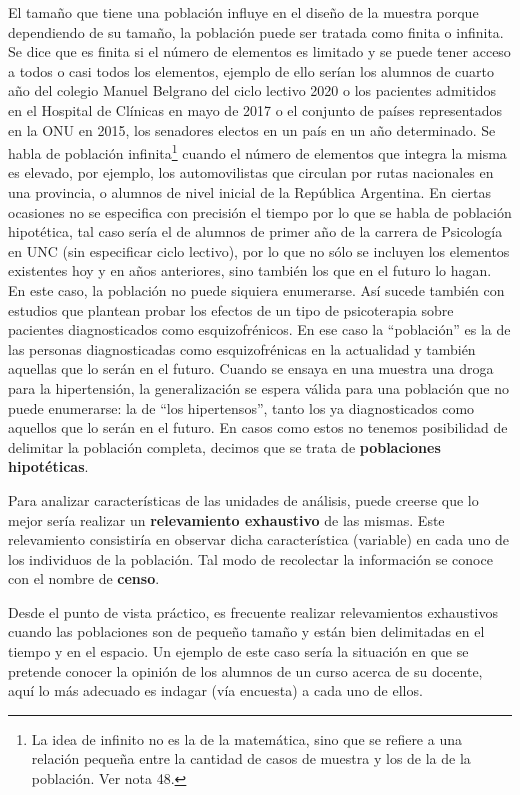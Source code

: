 \documentclass[]{book}
\let\rmarkdownfootnote\footnote%
\def\footnote{\protect\rmarkdownfootnote}
\begin{document}
El tamaño que tiene una población influye en el diseño de la muestra
porque dependiendo de su tamaño, la población puede ser tratada como
finita o infinita. Se dice que es finita si el número de elementos es
limitado y se puede tener acceso a todos o casi todos los elementos,
ejemplo de ello serían los alumnos de cuarto año del colegio Manuel
Belgrano del ciclo lectivo 2020 o los pacientes admitidos en el Hospital
de Clínicas en mayo de 2017 o el conjunto de países representados en la ONU en 2015, los senadores electos en un país en un año determinado. Se habla de población infinita\footnote{La idea de infinito no es la de la matemática, sino que se refiere a una relación pequeña entre la cantidad de casos de muestra y los de la de la población. Ver nota 48.} cuando
el número de elementos que integra la misma es elevado, por ejemplo, los automovilistas que circulan por rutas nacionales en una provincia, o alumnos de nivel inicial de la República Argentina. En ciertas ocasiones no se especifica con precisión el tiempo por lo que se habla de población hipotética, tal caso sería el de alumnos de primer año de la carrera de Psicología en UNC (sin especificar ciclo lectivo), por lo que no sólo se incluyen los elementos existentes hoy y en años anteriores, sino también los que en el futuro lo hagan. En este caso, la población no puede siquiera enumerarse. Así sucede también con estudios que plantean probar los efectos de un tipo de psicoterapia sobre pacientes diagnosticados como esquizofrénicos. En ese caso la ``población'' es la de las personas diagnosticadas como esquizofrénicas en la actualidad y también aquellas que lo serán en el futuro. Cuando se ensaya en una muestra una droga para la hipertensión, la generalización se espera válida para una población que no puede enumerarse: la de ``los hipertensos'', tanto los ya diagnosticados como aquellos que lo serán en el futuro. En casos como estos no tenemos posibilidad de delimitar la población completa, decimos que se trata de \textbf{poblaciones hipotéticas}.

Para analizar características de las unidades de análisis, puede creerse que lo mejor sería realizar un \textbf{relevamiento exhaustivo} de las mismas. Este relevamiento consistiría en observar dicha característica (variable) en cada uno de los individuos de la población. Tal modo de recolectar la información se conoce con el nombre de \textbf{censo}.

Desde el punto de vista práctico, es frecuente realizar relevamientos exhaustivos cuando las poblaciones son de pequeño tamaño y están bien delimitadas en el tiempo y en el espacio. Un ejemplo de este caso sería la situación en que se pretende conocer la opinión de los alumnos de un curso acerca de su docente, aquí lo más adecuado es indagar (vía encuesta) a cada uno de ellos.
\end{document}
